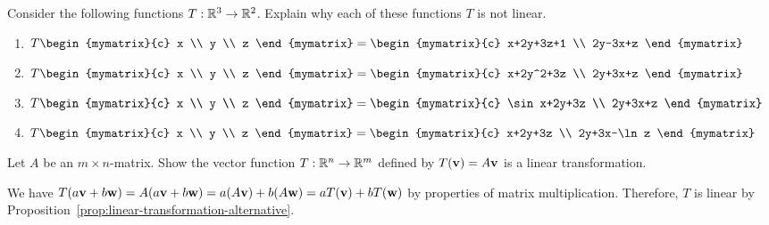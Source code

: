 \begin{ex} Consider the following functions $T:\mathbb{R}^3\rightarrow \mathbb{R}^2$.
  Explain why each of these functions $T$ is not linear.

  \begin{enumerate}
  \item $T\begin{mymatrix}{c}
      x \\
      y \\
      z
    \end{mymatrix} =\begin{mymatrix}{c}
      x+2y+3z+1 \\
      2y-3x+z
    \end{mymatrix} $

  \item $T\begin{mymatrix}{c}
      x \\
      y \\
      z
    \end{mymatrix} =\begin{mymatrix}{c}
      x+2y^2+3z \\
      2y+3x+z
    \end{mymatrix} $

  \item $T\begin{mymatrix}{c}
      x \\
      y \\
      z
    \end{mymatrix} =\begin{mymatrix}{c}
      \sin x+2y+3z \\
      2y+3x+z
    \end{mymatrix} $

  \item $T\begin{mymatrix}{c}
      x \\
      y \\
      z
    \end{mymatrix} =\begin{mymatrix}{c}
      x+2y+3z \\
      2y+3x-\ln z
    \end{mymatrix} $
  \end{enumerate}
\end{ex}

\begin{ex}
  Let $A$ be an $m\times n$-matrix. Show the vector function
  $T:\mathbb{R}^n\to \mathbb{R}^m$ defined by $T(\vect{v})=A\vect{v}$ is a
  linear transformation.
  \begin{sol}
    We have
    $T(a\vect{v}+b\vect{w}) = A(a\vect{v}+b\vect{w}) = a(A\vect{v}) +
    b(A\vect{w}) = aT(\vect{v}) + bT(\vect{w})$ by properties of
    matrix multiplication. Therefore, $T$ is linear by
    Proposition~\ref{prop:linear-transformation-alternative}.
  \end{sol}
\end{ex}

